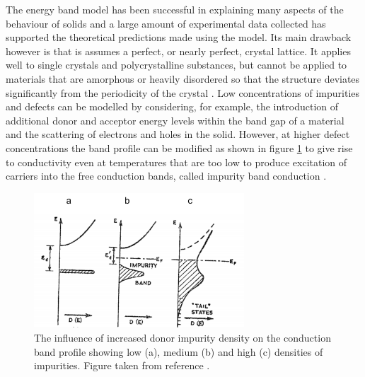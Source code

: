 The energy band model has been successful in explaining many aspects of the behaviour of solids and a large amount of experimental data collected has supported the theoretical predictions made using the model. Its main drawback however is that is assumes a perfect, or nearly perfect, crystal lattice. It applies well to single crystals and polycrystalline substances, but cannot be applied to materials that are amorphous or heavily disordered so that the structure deviates significantly from the periodicity of the crystal \cite{small_semiconductor1}. Low concentrations of impurities and defects can be modelled by considering, for example, the introduction of additional donor and acceptor energy levels within the band gap of a material and the scattering of electrons and holes in the solid. However, at higher defect concentrations the band profile can be modified as shown in figure \ref{bs2} to give rise to conductivity even at temperatures that are too low to produce excitation of carriers into the free conduction bands, called impurity band conduction \cite{small_semiconductor2}.\\

\begin{figure}[h!]
  \centering
    \includegraphics[width=0.7\textwidth]{figures/bs2.png}
    \caption{The influence of increased donor impurity density on the conduction band profile showing low (a), medium (b) and high (c) densities of impurities. Figure taken from reference .}
  \label{bs2}
\end{figure}

